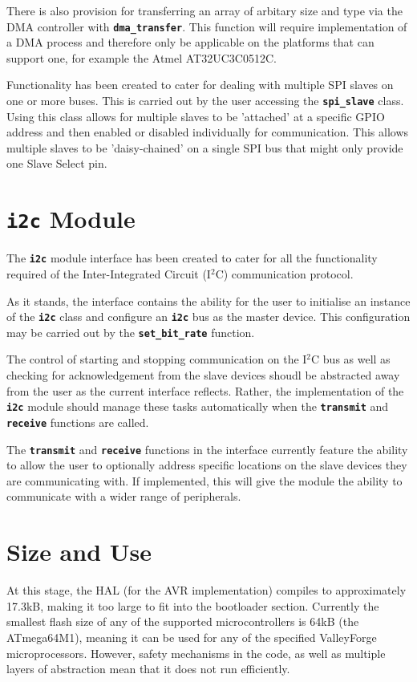 \documentclass[a4paper, oneside, 11pt, titlepage, onecolumn, openright]{report}
\begin{document}
{			There is also provision for transferring an array of arbitary size and type via the DMA controller with \textbf{\texttt{dma\_transfer}}. This function will require implementation of a DMA process and therefore only be applicable on the platforms that can support one, for example the Atmel AT32UC3C0512C.
			
			Functionality has been created to cater for dealing with multiple SPI slaves on one or more buses. This is carried out by the user accessing the \textbf{\texttt{spi\_slave}} class. Using this class allows for multiple slaves to be 'attached' at a specific GPIO address and then enabled or disabled individually for communication. This allows multiple slaves to be 'daisy-chained' on a single SPI bus that might only provide one Slave Select pin.
			
\section{\textbf{\texttt{i2c}} Module}
			\label{s:HALi2cModule}
			
			 The \textbf{\texttt{i2c}} module interface has been created to cater for all the functionality required of the Inter-Integrated Circuit (I$^{2}$C) communication protocol.
			 
			 As it stands, the interface contains the ability for the user to initialise an instance of the \textbf{\texttt{i2c}} class and configure an \textbf{\texttt{i2c}} bus as the master device. This configuration may be carried out by the \textbf{\texttt{set\_bit\_rate}} function.
			 
			 The control of starting and stopping communication on the I$^{2}$C bus as well as checking for acknowledgement from the slave devices shoudl be abstracted away from the user as the current interface reflects. Rather, the implementation of the \textbf{\texttt{i2c}} module should manage these tasks automatically when the \textbf{\texttt{transmit}} and \textbf{\texttt{receive}} functions are called.
			 
			 The \textbf{\texttt{transmit}} and \textbf{\texttt{receive}} functions in the interface currently feature the ability to allow the user to optionally address specific locations on the slave devices they are communicating with. If implemented, this will give the module the ability to communicate with a wider range of peripherals.
			
\section{Size and Use}
			\label{s:HALSizeAndUse}
			At this stage, the HAL (for the AVR implementation) compiles to approximately 17.3kB, making it too large to fit into the bootloader section. Currently the smallest flash size of any of the supported microcontrollers is 64kB (the ATmega64M1), meaning it can be used for any of the specified ValleyForge microprocessors. However, safety mechanisms in the code, as well as multiple layers of abstraction mean that it does not run efficiently.	
						
}
\end{document}
